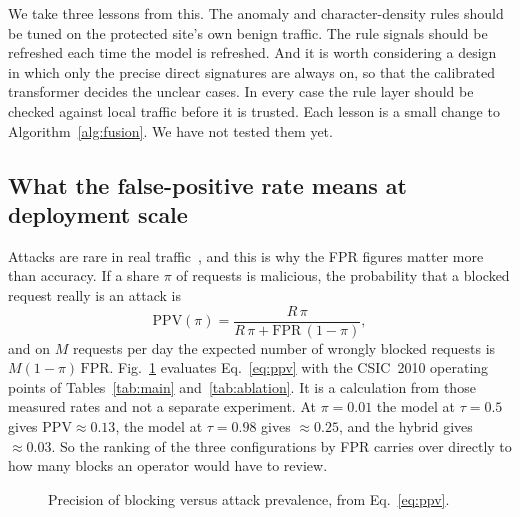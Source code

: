 \documentclass[preprint,11pt]{elsarticle}
\begin{document}
We take three lessons from this. The anomaly and character-density rules
should be tuned on the protected site's own benign traffic. The rule
signals should be refreshed each time the model is refreshed. And it is
worth considering a design in which only the precise direct signatures are
always on, so that the calibrated transformer decides the unclear cases.
In every case the rule layer should be checked against local traffic
before it is trusted. Each lesson is a small change to
Algorithm~\ref{alg:fusion}. We have not tested them yet.

\subsection{What the false-positive rate means at deployment scale}
Attacks are rare in real traffic~\cite{axelsson2000baserate}, and this is
why the FPR figures matter more than accuracy. If a share $\pi$ of requests
is malicious, the probability that a blocked request really is an attack is
\begin{equation}
\mathrm{PPV}(\pi)=\frac{R\,\pi}{R\,\pi+\mathrm{FPR}\,(1-\pi)},
\label{eq:ppv}
\end{equation}
and on $M$ requests per day the expected number of wrongly blocked
requests is $M(1-\pi)\,\mathrm{FPR}$. Fig.~\ref{fig:ppv} evaluates
Eq.~\eqref{eq:ppv} with the CSIC~2010 operating points of
Tables~\ref{tab:main} and~\ref{tab:ablation}. It is a calculation from
those measured rates and not a separate experiment. At $\pi=0.01$ the model
at $\tau=0.5$ gives $\mathrm{PPV}\approx0.13$, the model at $\tau=0.98$
gives $\approx0.25$, and the hybrid gives $\approx0.03$. So the ranking of
the three configurations by FPR carries over directly to how many blocks an
operator would have to review.

\begin{figure}[t]
\centering
{}
\caption{Precision of blocking versus attack prevalence, from Eq.~\eqref{eq:ppv}.}
\label{fig:ppv}
\end{figure}
\end{document}
